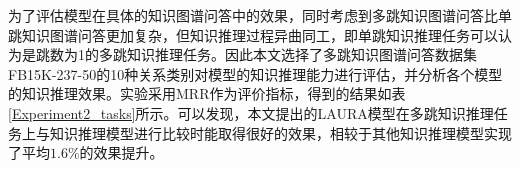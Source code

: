 \documentclass[algorithmlist, AutoFakeBold, AutoFakeSlant, figurelist, tablelist, nomlist, engineering]{seuthesix}
\begin{document}


为了评估模型在具体的知识图谱问答中的效果，同时考虑到多跳知识图谱问答比单跳知识图谱问答更加复杂，但知识推理过程异曲同工，即单跳知识推理任务可以认为是跳数为1的多跳知识推理任务。因此本文选择了多跳知识图谱问答数据集FB15K-237-50的10种关系类别对模型的知识推理能力进行评估，并分析各个模型的知识推理效果。实验采用MRR作为评价指标，得到的结果如表\ref{Experiment2_tasks}所示。可以发现，本文提出的LAURA模型在多跳知识推理任务上与知识推理模型进行比较时能取得很好的效果，相较于其他知识推理模型实现了平均$1.6\%$的效果提升。
\end{document}
